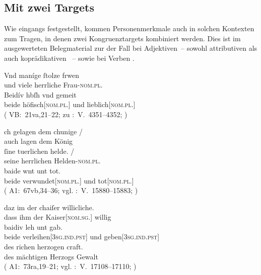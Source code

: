 \subsection{Mit zwei Targets}
\label{subsec:beidkoordtarg}

Wie eingangs festgestellt, kommen Personenmerkmale auch in
solchen Kontexten zum Tragen, in denen zwei Kongruenztargets kombiniert werden.
Dies ist im ausgewerteten Belegmaterial zur \KC{} der Fall bei Adjektiven~--
sowohl attributiven  als auch
koprädikativen ~-- sowie bei
Verben .

\largerpage %
\begin{exe}
\ex \begin{xlist}
	\ex\label{ex:konjattradj}
		\gll Vnd maníge ſtolze frwen \\
			und viele herrliche Frau-\textsc{nom.pl.\FemF} \\%
	\sn \gll Beidív hbſh vnd gemeit \\
			beide höfisch[\textsc{nom.pl.\FemF}] und lieblich[\textsc{nom.pl.\FemF}] \\
		\trans {} (%
				VB:~21va,21--22; zu
				\KC:~V.~4351--4352;
				\cite[161]{schroeder1895}%
			)

	\ex \label{ex:konjcopredadj}
		\gll {}ch gelagen dem chunige {/} \\
			auch lagen dem König \\
		\gll ſine tuerlichen helde. {/} \\
			seine herrlichen Helden-\textsc{nom.pl.\MascM} \\
		\gll baide wnt unt tot. \\
			beide verwundet[\textsc{nom.pl.\MascM}] und tot[\textsc{nom.pl.\MascM}] \\
		\trans {}
			(%
				A1:~67vb,34--36; vgl.
				\KC:~V.~15880--15883;
				\cite[368]{schroeder1895}%
			)

	\ex \label{ex:konjvb}
		\gll daz im der chaiſer willicliche. \\
			dass ihm der Kaiser[\textsc{nom.sg.\MascM}] willig \\
	\sn \gll baidiv leh unt gab. \\
			beide verleihen[\textsc{3sg\subM.ind.pst}] und
			geben[\textsc{3sg\subM.ind.pst}] \\
	\sn \gll des richen herzogen craft. \\
			des mächtigen Herzogs Gewalt \\
		\trans {}
			(%
				A1:~73ra,19--21; vgl.
				\KC:~V.~17108--17110;
				\cite[389]{schroeder1895}%
			)
	\end{xlist}
\end{exe}

